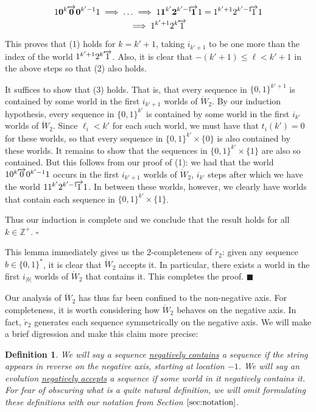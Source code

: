 \documentclass[12pt]{amsart}
\newtheorem{definition}[theorem]{Definition}
\newcommand{\raa}[1]{\hspace{-0.11cm}\overrightarrow{#1}}
\newcommand{\rtwo}{\mathring{r}_2}
\newcommand{\wtwo}{\mathring{W}_2}
\newcommand{\zp}{\mathbb{Z}^+}
\begin{document}
$$1\textbf{0}^{k'}\raa{\textbf{0}}\textbf{0}^{k'-1}1 \implies \ldots \implies 1\textbf{1}^{k'}\textbf{2}^{k'-1}\raa{\textbf{1}}1 = 1^{k'+1}2^{k'-1}\raa{1}1$$
$$\implies 1^{k'+1}2^{k'}\raa{1}$$

This proves that (1) holds for $k = k' + 1$, taking $i_{k' + 1}$ to be one more than the index of the world $1^{k'+1}2^{k'}\raa{1}$. Also, it is clear that $-(k' + 1) \leq \ell < k' + 1$ in the above steps so that (2) also holds.

It suffices to show that (3) holds. That is, that every sequence in $\{0, 1\}^{k' + 1}$ is contained by some world in the first $i_{k'+1}$ worlds of $\wtwo$. By our induction hypothesis, every sequence in $\{0, 1\}^{k'}$ is contained by some world in the first $i_{k'}$ worlds of $\wtwo$. Since $\ell_i < k'$ for each such world, we must have that $t_i(k') = 0$ for these worlds, so that every sequence in $\{0, 1\}^{k'} \times \{0\}$ is also contained by these worlds. It remains to show that the sequences in $\{0, 1\}^{k'} \times \{1\}$ are also so contained. But this follows from our proof of (1): we had that the world $10^{k'}\raa{0}0^{k'-1}1$ occurs in the first $i_{k'+1}$ worlds of $\wtwo$, $i_{k'}$ steps after which we have the world $11^{k'}2^{k'-1}\raa{1}1$. In between these worlds, however, we clearly have worlds that contain each sequence in $\{0, 1\}^{k'} \times \{1\}$.

Thus our induction is complete and we conclude that the result holds for all $k\in \zp$. $\square$

This lemma immediately gives us the $2$-completeness of $\rtwo$: given any sequence $b\in \{0, 1\}^*$, it is clear that $\wtwo$ accepts it. In particular, there exists a world in the first $i_{|b|}$ worlds of $\wtwo$ that contains it. This completes the proof. $\blacksquare$

Our analysis of $\wtwo$ has thus far been confined to the non-negative axis. For completeness, it is worth considering how $\wtwo$ behaves on the negative axis. In fact, $\rtwo$ generates each sequence symmetrically on the negative axis. We will make a brief digression and make this claim more precise:

\begin{definition}
We will say a sequence \underline{negatively contains} a sequence if the string appears in reverse on the negative axis, starting at location $-1$. We will say an evolution \underline{negatively accepts} a sequence if some world in it negatively contains it. For fear of obscuring what is a quite natural definition, we will omit formulating these definitions with our notation from Section $\ref{sec:notation}$.
\end{definition}
\end{document}
